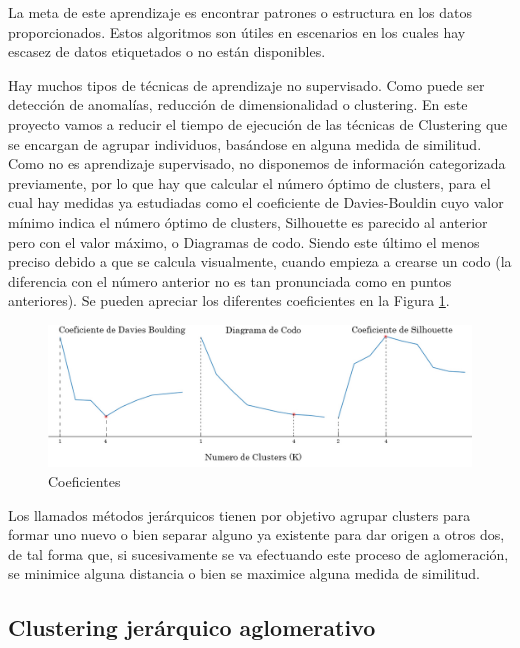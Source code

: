 La meta de este aprendizaje es encontrar patrones o estructura en los datos proporcionados. Estos algoritmos son útiles en escenarios en los cuales hay escasez de datos etiquetados o no están disponibles.

Hay muchos tipos de técnicas de aprendizaje no supervisado. Como puede ser detección de anomalías, reducción de dimensionalidad o clustering. En este proyecto vamos a reducir el tiempo de ejecución de las técnicas de Clustering que se encargan de agrupar individuos, basándose en alguna medida de similitud. Como no es aprendizaje supervisado, no disponemos de información categorizada previamente, por lo que hay que calcular el número óptimo de clusters, para el cual hay medidas ya estudiadas como el coeficiente de Davies-Bouldin cuyo valor mínimo indica el número óptimo de clusters, Silhouette es parecido al anterior pero con el valor máximo, o Diagramas de codo. Siendo este último el menos preciso debido a que se calcula visualmente, cuando empieza a crearse un codo (la diferencia con el número anterior no es tan pronunciada como en puntos anteriores). Se pueden apreciar los diferentes coeficientes en la Figura \ref{fig:coeficientes}. 


\begin{figure}[!h]
	\centering
	\includegraphics[width=1\textwidth]{images/chapter_2/ap_nosup_diagramas}
	\caption{Coeficientes}
	\label{fig:coeficientes}
\end{figure}


Los llamados métodos jerárquicos \cite{ackermann2014analysis} tienen por objetivo agrupar clusters para formar uno nuevo o bien separar alguno ya existente para dar origen a otros dos, de tal forma que, si sucesivamente se va efectuando este proceso de aglomeración, se minimice alguna distancia o bien se maximice alguna medida de similitud.

\subsection{Clustering jerárquico aglomerativo}

